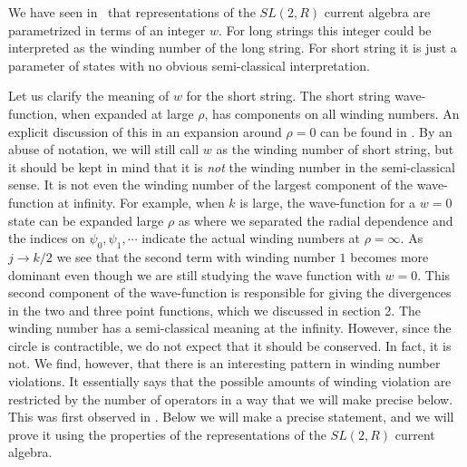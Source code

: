 


We have seen in \first\ that representations of the
$SL(2,R)$ current algebra
are parametrized in terms of an integer $w$. For long strings this integer
could be interpreted as the winding number of the long string. For short
string it is just a parameter of states with no obvious semi-classical
interpretation.

Let us clarify the meaning of $w$ for the short string.
The short string wave-function, when expanded at large $\rho$, has components
on all winding numbers. An explicit discussion of this in an expansion
around $\rho=0$ can be found in \first . By an abuse of notation, we
will still call $w$ as the winding number of short string, but it
should be
kept in mind that it is {\it not} the winding number in the semi-classical
sense. It is not even the
winding number of the largest component of the wave-function at infinity.
For example, when $k$ is large, the wave-function for a $w=0$ state
can be expanded large $\rho$ as
\eqn{}
where we separated the radial dependence and the indices on
$\psi_0, \psi_1, \cdots$ indicate the actual
winding numbers at $\rho=\infty$.
As $j\to k/2$ we see that the second term with winding number $1$
becomes more dominant even though we are still studying the wave
function with $w=0$. This second component of the wave-function
is responsible for giving the divergences in the two and
three point functions, which we discussed in section 2.
The winding number has a semi-classical meaning at the infinity.
However, since the circle
is contractible, we do not expect that it should be conserved.
In fact, it is not. We find, however, that there is an
interesting pattern in winding number violations.
It essentially says that the possible amounts of winding violation
are restricted by the number of operators in a way that we will make
precise below. This was first observed  in \zam .
Below
we will make a precise statement, and we will prove it using the
properties of the representations of the $SL(2,R)$ current algebra.

